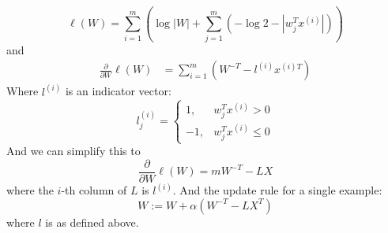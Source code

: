 \begin{answer}
$$
\ell(W) = \sum_{i=1}^m(\log |W| + \sum_{j=1}^m(-\log 2 - |w^T_jx^{(i)}|))
$$
and
$$
\begin{aligned}
\frac{\partial }{\partial W}\ell(W) &= \sum_{i=1}^m (W^{-T} -  l^{(i)}x^{(i)T})
\end{aligned}
$$
Where $l^{(i)}$ is an indicator vector:
$$
l^{(i)}_j = \begin{cases}
1, &w_j^Tx^{(i)} >0\\
-1, &w^T_jx^{(i)}\le 0
\end{cases}
$$
And we can simplify this to
$$
\frac{\partial }{\partial W}\ell(W) = mW^{-T} - LX
$$
where the $i$-th column of $L$ is $l^{(i)}$. And the update rule for a single example:
$$
W:= W + \alpha(W^{-T}  - LX^T)
$$
where $l$ is as defined above.
\end{answer}
